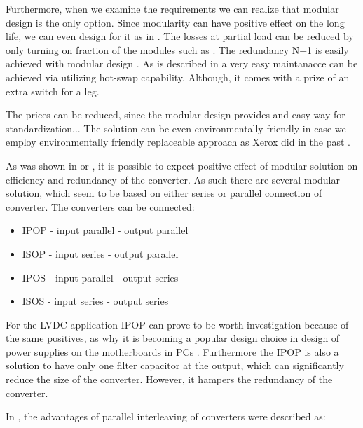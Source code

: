 \documentclass[]{scrartcl}
\begin{document}
Furthermore, when we examine the requirements we can realize that modular design is the only option. Since modularity can have positive effect on the long life, we can even design for it as in \cite{Newcomb1996}. The losses at partial load can be reduced by only turning on fraction of the modules such as \cite{Liserre2016a}. The redundancy N+1 is easily achieved with modular design \cite{Doncker2014}. As is described in \cite{Cottet2015} a very easy maintanacce can be achieved via utilizing hot-swap capability. Although, it comes with a prize of an extra switch for a leg. 

The prices can be reduced, since the modular design provides and easy way for standardization... The solution can be even environmentally friendly in case we employ environmentally friendly replaceable approach as Xerox did in the past \cite{Ulrich2004}.


%
 As was shown in \cite{Yang2014} or \cite{Quartarone}, it is possible to expect positive effect of modular solution on efficiency and redundancy of the converter. As such there are several modular solution, which seem to be based on either series or parallel connection of converter. The converters can be connected:
\begin{itemize}
	\item IPOP - input parallel - output parallel
	\item ISOP - input series - output parallel
	\item IPOS - input parallel - output series
	\item ISOS - input series - output series
\end{itemize}


For the LVDC application IPOP can prove to be worth investigation because of the same positives, as why it is becoming a popular design choice in design of power supplies on the motherboards in PCs \cite{VanWyk2014}. Furthermore the IPOP is also a solution to have only one filter capacitor at the output, which can significantly reduce the size of the converter. However, it hampers the redundancy of the converter.


In \cite{Kolar2014a}, the advantages of parallel interleaving of converters were described as:
\end{document}
